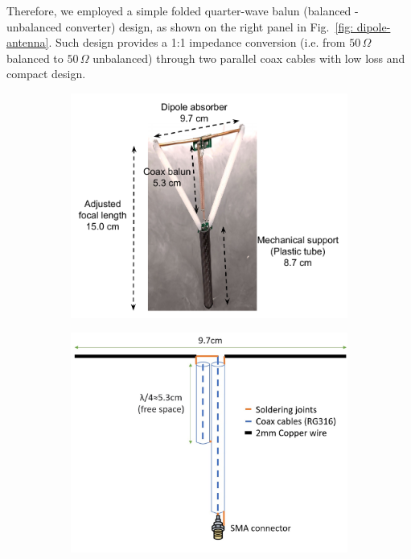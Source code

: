 \documentclass[12pt]{article}
\begin{document}
     Therefore, we employed a simple folded quarter-wave balun (balanced - unbalanced converter) design, as shown on the right panel in Fig.~\ref{fig: dipole-antenna}. Such design provides a 1:1 impedance conversion (i.e. from $50\, \Omega$ balanced to $50\, \Omega$ unbalanced) through two parallel coax cables with low loss and compact design. 
     \begin{figure}
        \centering
        \begin{subfigure}[b]{0.45\textwidth}
            \centering
    	    \includegraphics[width=\textwidth]{plots/wok-dipole.pdf}
        \end{subfigure}
        \hfill
        \begin{subfigure}[b]{0.45\textwidth}
    	    \centering
    	    \includegraphics[width=\textwidth]{plots/balun.jpg}

\end{subfigure}
\end{figure}
\end{document}
